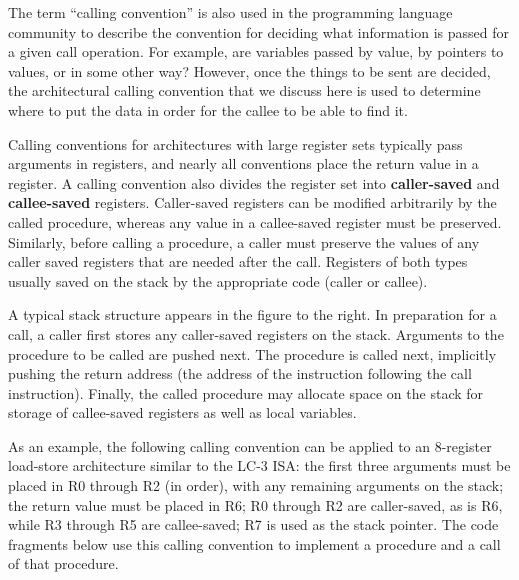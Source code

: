 The term ``calling convention'' is also used in the programming
language community to describe the convention for deciding what
information is passed for a given call operation.  For example, are
variables passed by value, by pointers to values, or in some other
way?  However, once the things to be sent are decided, the
architectural calling convention that we discuss here is used
to determine where to put the data in order for the callee to be able
to find it.

Calling conventions for architectures with large register sets
typically pass arguments in registers, and nearly all conventions
place the return value in a register.  A calling convention also
divides the register set into {\bf caller-saved} and 
{\bf callee-saved} registers.  Caller-saved registers can be modified 
arbitrarily
by the called procedure, whereas any value in a callee-saved register
must be preserved.  Similarly, before calling a procedure, a caller
must preserve the values of any caller saved registers that are needed
after the call.  Registers of both types usually saved on the stack by
the appropriate code (caller or callee).

\vfill
\pagebreak

\begin{minipage}{5in}
A typical stack structure appears in the figure to the right.  In
preparation for a call, a caller first stores any caller-saved
registers on the stack.  Arguments to the procedure to be called are
pushed next.  The procedure is called next, implicitly pushing the
return address (the address of the instruction following the call
instruction).  Finally, the called procedure may allocate space on the
stack for storage of callee-saved registers as well as local
variables.\mpline

As an example, the following calling convention can be applied to 
an \mbox{8-register} load-store architecture similar to the \mbox{LC-3}
ISA: the first three arguments must be placed in R0 through R2 (in order), 
with any remaining arguments on the stack; the return value must be placed 
in R6; R0 through R2 are caller-saved, as
is R6, while R3 through R5 are callee-saved; R7 is used as the stack
pointer.  The code fragments below use this calling convention to
implement a procedure and a call of that procedure.
\end{minipage}\hspace{.25in}%
\begin{minipage}{1.25in}
\end{minipage}

